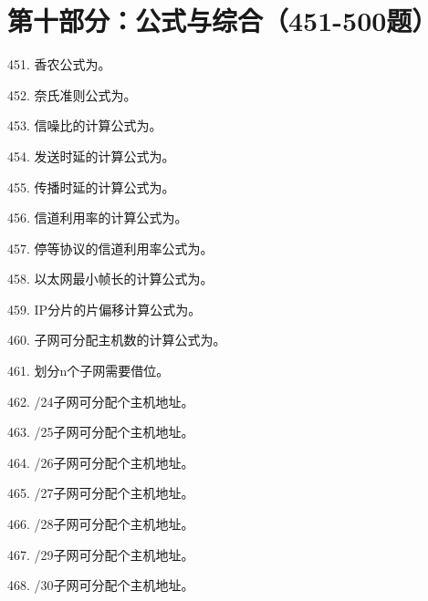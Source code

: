 \section{第十部分：公式与综合（451-500题）}

451. 香农公式为\underline{\hspace{6cm}}。

452. 奈氏准则公式为\underline{\hspace{6cm}}。

453. 信噪比的计算公式为\underline{\hspace{4cm}}。

454. 发送时延的计算公式为\underline{\hspace{4cm}}。

455. 传播时延的计算公式为\underline{\hspace{4cm}}。

456. 信道利用率的计算公式为\underline{\hspace{4cm}}。

457. 停等协议的信道利用率公式为\underline{\hspace{4cm}}。

458. 以太网最小帧长的计算公式为\underline{\hspace{4cm}}。

459. IP分片的片偏移计算公式为\underline{\hspace{4cm}}。

460. 子网可分配主机数的计算公式为\underline{\hspace{4cm}}。

461. 划分n个子网需要借\underline{\hspace{2cm}}位。

462. /24子网可分配\underline{\hspace{2cm}}个主机地址。

463. /25子网可分配\underline{\hspace{2cm}}个主机地址。

464. /26子网可分配\underline{\hspace{2cm}}个主机地址。

465. /27子网可分配\underline{\hspace{2cm}}个主机地址。

466. /28子网可分配\underline{\hspace{2cm}}个主机地址。

467. /29子网可分配\underline{\hspace{2cm}}个主机地址。

468. /30子网可分配\underline{\hspace{2cm}}个主机地址。

